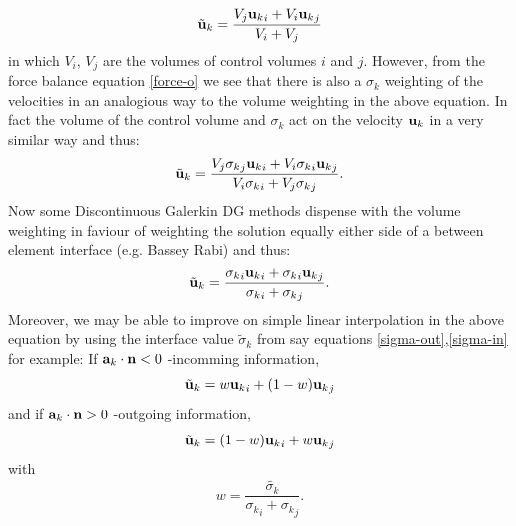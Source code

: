 \begin{equation}
{\tilde{\bf u}_k} = \frac{ V_j {{\bf u}_k}_i + V_i {{\bf u}_k}_j  } {V_i +V_j} 
\end{equation} 
in which $V_i$, $V_j$ are the volumes of control volumes $i$ and $j$. 
However, from the force balance equation 
\ref{force-o}  we see that there is also a $\sigma_k$ weighting of the 
velocities in an analogious way to the volume weighting in the above equation. 
In fact the volume of the control volume and $\sigma_k$ act on the velocity ${\bf u}_k$ in a very similar 
way and thus: 
\begin{equation}
{\tilde{\bf u}_k} = \frac{ V_j {\sigma_k}_j {{\bf u}_k}_i + V_i {\sigma_k}_i {{\bf u}_k}_j }
{ V_i {\sigma_k}_i + V_j  {\sigma_k}_j  }. 
\end{equation} 
Now some Discontinuous Galerkin DG methods dispense with the volume weighting 
in faviour of weighting the solution equally either side of a between element interface (e.g. Bassey Rabi) 
and thus: 
\begin{equation}
{\tilde{\bf u}_k} = \frac{ {\sigma_k}_i{{\bf u}_k}_i + {\sigma_k}_i {{\bf u}_k}_j }
{ {\sigma_k}_i + {\sigma_k}_j }. 
\end{equation} 
Moreover, we may be able to improve on simple linear interpolation in the above equation 
by using the interface value $\tilde\sigma_k$ from say equations \ref{sigma-out},\ref{sigma-in} for 
example: 
If ${\bf a}_k\cdot {\bf n}<0$ -incomming information, 
\begin{equation}
{\tilde{\bf u}_k} = w {{\bf u}_k}_i + (1-w) {{\bf u}_k}_j
\end{equation} 
and if ${\bf a}_k\cdot {\bf n}>0$ -outgoing information, 
\begin{equation}
{\tilde{\bf u}_k} = (1-w) {{\bf u}_k}_i + w {{\bf u}_k}_j
\end{equation} 
with
\begin{equation}
w=\frac{\tilde{\sigma_k}}{ {\sigma_k}_i + {\sigma_k}_j }. 
\end{equation} 


